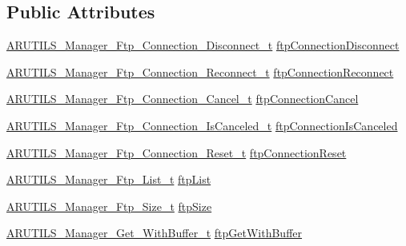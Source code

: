 \subsection*{Public Attributes}
\begin{DoxyCompactItemize}
\item 
\hyperlink{_a_r_u_t_i_l_s___manager_8h_a8b748d98b39d617c344b4640cc9e67ee}{A\+R\+U\+T\+I\+L\+S\+\_\+\+Manager\+\_\+\+Ftp\+\_\+\+Connection\+\_\+\+Disconnect\+\_\+t} \hyperlink{struct_a_r_u_t_i_l_s___manager__t_a0a31016d3663dcce8ac95be0154a78a4}{ftp\+Connection\+Disconnect}
\item 
\hyperlink{_a_r_u_t_i_l_s___manager_8h_aa324672bcf09b155ed3fe4519a458488}{A\+R\+U\+T\+I\+L\+S\+\_\+\+Manager\+\_\+\+Ftp\+\_\+\+Connection\+\_\+\+Reconnect\+\_\+t} \hyperlink{struct_a_r_u_t_i_l_s___manager__t_a7c7650fc04726bb20c429aa0bf821e58}{ftp\+Connection\+Reconnect}
\item 
\hyperlink{_a_r_u_t_i_l_s___manager_8h_a4d406634a683a3b060e74d9bf1197f03}{A\+R\+U\+T\+I\+L\+S\+\_\+\+Manager\+\_\+\+Ftp\+\_\+\+Connection\+\_\+\+Cancel\+\_\+t} \hyperlink{struct_a_r_u_t_i_l_s___manager__t_a1f96589a1ecf3a98ccd8f28265544217}{ftp\+Connection\+Cancel}
\item 
\hyperlink{_a_r_u_t_i_l_s___manager_8h_a4a5a69fc8a61bcf7cfff32a8a5efe16e}{A\+R\+U\+T\+I\+L\+S\+\_\+\+Manager\+\_\+\+Ftp\+\_\+\+Connection\+\_\+\+Is\+Canceled\+\_\+t} \hyperlink{struct_a_r_u_t_i_l_s___manager__t_a055cb92cde03cfe9ad703570ab5a6a0e}{ftp\+Connection\+Is\+Canceled}
\item 
\hyperlink{_a_r_u_t_i_l_s___manager_8h_a27aed4da66885ae9a1b24eed84cafd1a}{A\+R\+U\+T\+I\+L\+S\+\_\+\+Manager\+\_\+\+Ftp\+\_\+\+Connection\+\_\+\+Reset\+\_\+t} \hyperlink{struct_a_r_u_t_i_l_s___manager__t_acc1e2d496d414f05cee7011e66f598c0}{ftp\+Connection\+Reset}
\item 
\hyperlink{_a_r_u_t_i_l_s___manager_8h_a06214eee396ff3912eddcd3b8562b0a3}{A\+R\+U\+T\+I\+L\+S\+\_\+\+Manager\+\_\+\+Ftp\+\_\+\+List\+\_\+t} \hyperlink{struct_a_r_u_t_i_l_s___manager__t_af23c98cbcff4241359c5282de39f362e}{ftp\+List}
\item 
\hyperlink{_a_r_u_t_i_l_s___manager_8h_af0e797fd8279b23438dd284863ee7cc3}{A\+R\+U\+T\+I\+L\+S\+\_\+\+Manager\+\_\+\+Ftp\+\_\+\+Size\+\_\+t} \hyperlink{struct_a_r_u_t_i_l_s___manager__t_a6916eded8c9f66f54a9407f0b2941588}{ftp\+Size}
\item 
\hyperlink{_a_r_u_t_i_l_s___manager_8h_ae2a8928b8ec5838667dbfa90755ea5f6}{A\+R\+U\+T\+I\+L\+S\+\_\+\+Manager\+\_\+\+Get\+\_\+\+With\+Buffer\+\_\+t} \hyperlink{struct_a_r_u_t_i_l_s___manager__t_a51ece456ae8f051f8a5a10b5bef6b6b8}{ftp\+Get\+With\+Buffer}

\end{DoxyCompactItemize}

